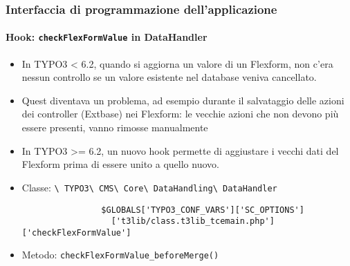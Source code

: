 \begin{frame}[fragile]
	\frametitle{Interfaccia di programmazione dell'applicazione}
	\framesubtitle{Hook: \texttt{checkFlexFormValue} in DataHandler}

	\begin{itemize}
		\item In TYPO3 < 6.2, quando si aggiorna un valore di un Flexform, non c'era nessun controllo se un valore esistente nel database veniva cancellato.
		\item Quest diventava un problema, ad esempio durante il salvataggio delle azioni dei controller (Extbase) nei Flexform: le vecchie azioni che non devono più essere presenti, vanno rimosse manualmente

		\item In TYPO3 >= 6.2, un nuovo hook permette di aggiustare i vecchi dati del Flexform prima di essere unito a quello nuovo.
		\item Classe:\newline
			\smaller
				\texttt{\textbackslash
					TYPO3\textbackslash
					CMS\textbackslash
					Core\textbackslash
					DataHandling\textbackslash
					DataHandler}\normalsize

			\lstset{
				basicstyle=\smaller\ttfamily
			}

			\begin{lstlisting}
				$GLOBALS['TYPO3_CONF_VARS']['SC_OPTIONS']
				  ['t3lib/class.t3lib_tcemain.php']['checkFlexFormValue']
			\end{lstlisting}

		\item Metodo:\newline
			\smaller
				\texttt{checkFlexFormValue\_beforeMerge()}

	\end{itemize}

\end{frame}


